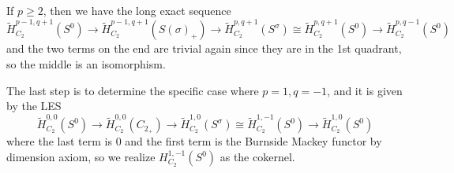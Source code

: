 \documentclass{article}
\theoremstyle{definition}
\begin{document}
If $p\geq 2$, then we have the long exact sequence 
\[\tilde{H}_{C_2}^{p-1,q+1}(S^0)\to \tilde{H}_{C_2}^{p-1,q+1}(S({\sigma})_+)\to \tilde{H}_{C_2}^{p,q+1}(S^{\sigma})\cong \tilde{H}_{C_2}^{p,q+1}(S^0) \to \tilde{H}_{C_2}^{p,q-1}(S^0) \]
and the two terms on the end are trivial again since they are in the 1st quadrant, so the middle is an isomorphism. 

The last step is to determine the specific case where $p=1,q=-1$, and it is given by the LES
\[\tilde{H}_{C_2}^{0,0}(S^0)\to  \tilde{H}_{C_2}^{0,0}(C_{2_+})\to \tilde{H}_{C_2}^{1,0}(S^{\sigma})\cong \tilde{H}_{C_2}^{1,-1}(S^0)\to  \tilde{H}_{C_2}^{1,0}(S^0)\]
where the last term is $0$ and the first term is the Burnside Mackey functor by dimension axiom, so we realize $H_{C_2}^{1,-1}(S^0)$ as the cokernel. 



\newpage
\printbibliography
\end{document}
